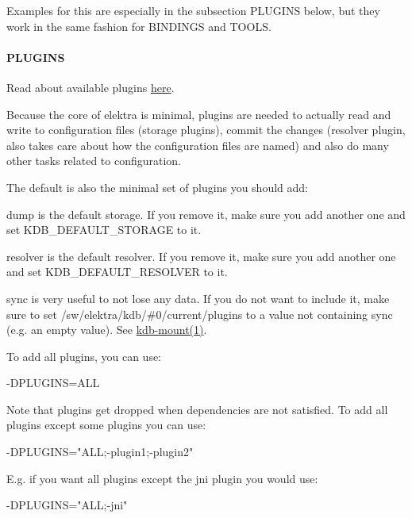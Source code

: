 Examples for this are especially in the subsection P\+L\+U\+G\+I\+N\+S below, but they work in the same fashion for B\+I\+N\+D\+I\+N\+G\+S and T\+O\+O\+L\+S.

\paragraph*{P\+L\+U\+G\+I\+N\+S}

Read about available plugins \hyperlink{md_src_plugins_README_src_plugins_README_md}{here}.

Because the core of elektra is minimal, plugins are needed to actually read and write to configuration files (storage plugins), commit the changes (resolver plugin, also takes care about how the configuration files are named) and also do many other tasks related to configuration.

The default is also the minimal set of plugins you should add\+:
\begin{DoxyItemize}
\item dump is the default storage. If you remove it, make sure you add another one and set {\ttfamily K\+D\+B\+\_\+\+D\+E\+F\+A\+U\+L\+T\+\_\+\+S\+T\+O\+R\+A\+G\+E} to it.
\item resolver is the default resolver. If you remove it, make sure you add another one and set {\ttfamily K\+D\+B\+\_\+\+D\+E\+F\+A\+U\+L\+T\+\_\+\+R\+E\+S\+O\+L\+V\+E\+R} to it.
\item sync is very useful to not lose any data. If you do not want to include it, make sure to set {\ttfamily /sw/elektra/kdb/\#0/current/plugins} to a value not containing sync (e.\+g. an empty value). See \hyperlink{md_doc_help_kdb-mount_doc_help_kdb-mount_md}{kdb-\/mount(1)}.
\end{DoxyItemize}

To add all plugins, you can use\+: \begin{DoxyVerb}    -DPLUGINS=ALL
\end{DoxyVerb}


Note that plugins get dropped when dependencies are not satisfied. To add all plugins except some plugins you can use\+: \begin{DoxyVerb}    -DPLUGINS="ALL;-plugin1;-plugin2"
\end{DoxyVerb}


E.\+g. if you want all plugins except the jni plugin you would use\+: \begin{DoxyVerb}    -DPLUGINS="ALL;-jni"
\end{DoxyVerb}


